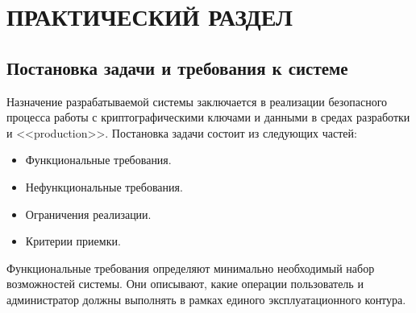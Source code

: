 \documentclass[14pt, a4paper]{extarticle}
\begin{document}
	\section[Практический раздел]{ПРАКТИЧЕСКИЙ РАЗДЕЛ}
	
	\subsection{Постановка задачи и требования к системе}
	
	Назначение разрабатываемой системы заключается в реализации безопасного процесса работы с криптографическими ключами и данными в средах разработки и <<production>>. Постановка задачи состоит из следующих частей:
	
	\begin{itemize}
		\item Функциональные требования.
		\item Нефункциональные требования.
		\item Ограничения реализации.
		\item Критерии приемки.
	\end{itemize}
	
	Функциональные требования определяют минимально необходимый набор возможностей системы. Они описывают, какие операции пользователь и администратор должны выполнять в рамках единого эксплуатационного контура.
	
\end{document}
